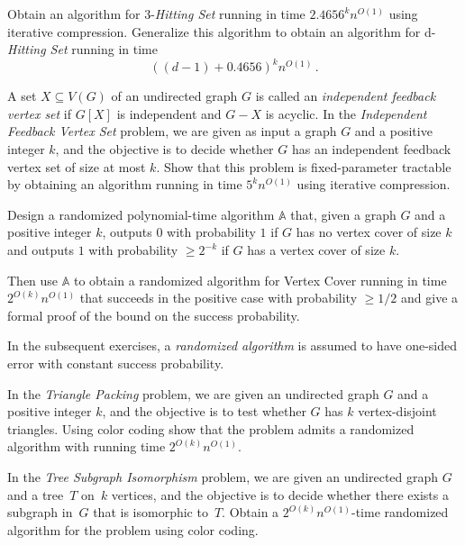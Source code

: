 \begin{exercise}
Obtain an algorithm for 3-\emph{Hitting Set} running in time $2.4656^kn^{O(1)}$ using iterative compression. Generalize this algorithm to obtain an algorithm for d-\emph{Hitting Set} running in time \[((d-1)+0.4656)^kn^{O(1)} \,. \]
\end{exercise}

\begin{exercise}[\hard]
A set $X \subseteq V(G)$ of an undirected graph $G$ is called an \emph{independent feedback vertex set} if $G[X]$ is independent and $G - X$ is acyclic. In the \emph{Independent Feedback Vertex Set} problem, we are given as input a graph $G$ and a positive integer $k$, and the objective is to decide whether $G$ has an independent feedback vertex set of size at most $k$. Show that this problem is fixed-parameter tractable by obtaining an algorithm running in time $5^kn^{O(1)}$ using iterative compression.
\end{exercise}

\begin{exercise}[\easy]
Design a randomized polynomial-time algorithm $\mathbb{A}$ that, given a graph $G$ and a positive integer $k$, outputs $0$ with probability $1$ if $G$ has no vertex cover of size $k$ and outputs $1$ with probability $\geq 2^{-k}$ if $G$ has a vertex cover of size $k$.

Then use $\mathbb{A}$ to obtain a randomized algorithm for Vertex Cover running in time $2^{O(k)} n^{O(1)}$ that succeeds in the positive case with probability $\geq 1/2$ and give a formal proof of the bound on the success probability.
\end{exercise}

In the subsequent exercises, a \emph{randomized algorithm} is assumed to have one-sided error with constant success probability.

\begin{exercise}[\easy]
In the \emph{Triangle Packing} problem, we are given an undirected graph $G$ and a positive integer $k$, and the objective is to test whether $G$ has $k$ vertex-disjoint triangles. Using color coding show that the problem admits a randomized algorithm with running time $2^{O(k)} n^{O(1)}$.
\end{exercise}


\begin{exercise}
In the \emph{Tree Subgraph Isomorphism} problem, we are given an undirected graph $G$ and a tree~$T$ on~$k$ vertices, and the objective is to decide whether there exists a subgraph in~$G$ that is isomorphic to~$T$. Obtain a $2^{O(k)}n^{O(1)}$-time randomized algorithm for the problem using color coding.
\end{exercise}



